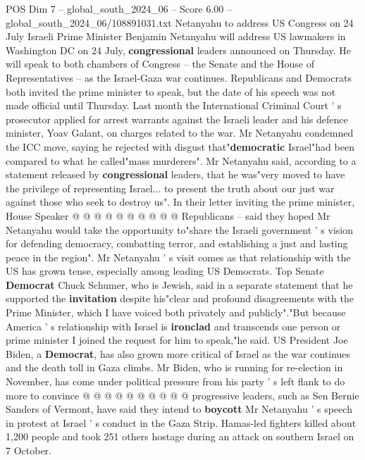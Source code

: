 \begin{textsample}{POS Dim 7 – global\_south\_2024\_06 – Score 6.00 – global\_south\_2024\_06/108891031.txt}  \label{ex:f7_pos_240}
Netanyahu to address US Congress on 24 July Israeli Prime Minister Benjamin Netanyahu will address US lawmakers in Washington DC on 24 July, \textbf{congressional} leaders announced on Thursday.
He will speak to both chambers of Congress -- the Senate and the House of Representatives -- as the Israel-Gaza war continues.
Republicans and Democrats both invited the prime minister to speak, but the date of his speech was not made official until Thursday.
Last month the International Criminal Court ' s prosecutor applied for arrest warrants against the Israeli leader and his defence minister, Yoav Galant, on charges related to the war.
Mr Netanyahu condemned the ICC move, saying he rejected with disgust that"\textbf{democratic} Israel"had been compared to what he called"mass murderers".
Mr Netanyahu said, according to a statement released by \textbf{congressional} leaders, that he was"very moved to have the privilege of representing Israel... to present the truth about our just war against those who seek to destroy us".
In their letter inviting the prime minister, House Speaker @ @ @ @ @ @ @ @ @ @ Republicans -- said they hoped Mr Netanyahu would take the opportunity to"share the Israeli government ' s vision for defending democracy, combatting terror, and establishing a just and lasting peace in the region".
Mr Netanyahu ' s visit comes as that relationship with the US has grown tense, especially among leading US Democrats.
Top Senate \textbf{Democrat} Chuck Schumer, who is Jewish, said in a separate statement that he supported the \textbf{invitation} despite his"clear and profound disagreements with the Prime Minister, which I have voiced both privately and publicly"."But because America ' s relationship with Israel is \textbf{ironclad} and transcends one person or prime minister I joined the request for him to speak,"he said.
US President Joe Biden, a \textbf{Democrat}, has also grown more critical of Israel as the war continues and the death toll in Gaza climbs.
Mr Biden, who is running for re-election in November, has come under political pressure from his party ' s left flank to do more to convince @ @ @ @ @ @ @ @ @ @ progressive leaders, such as Sen Bernie Sanders of Vermont, have said they intend to \textbf{boycott} Mr Netanyahu ' s speech in protest at Israel ' s conduct in the Gaza Strip.
Hamas-led fighters killed about 1,200 people and took 251 others hostage during an attack on southern Israel on 7 October.

\end{textsample}
